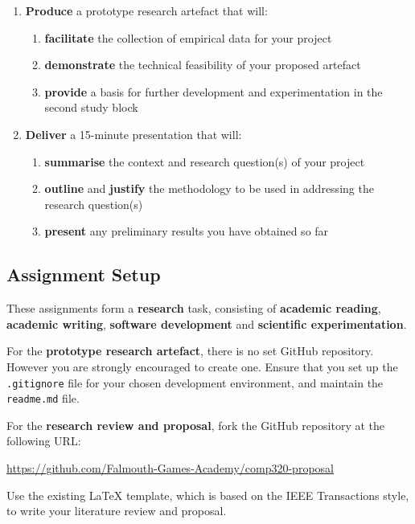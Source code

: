 \documentclass{../fal_assignment}
\begin{document}
\begin{enumerate}[label=(\Alph*)]
\begin{enumerate}[label=(\roman*)]
		\end{enumerate}
	\item \textbf{Produce} a prototype research artefact that will:
		\begin{enumerate}[label=(\roman*)]
			\item \textbf{facilitate} the collection of empirical data for your project
			\item \textbf{demonstrate} the technical feasibility of your proposed artefact
			\item \textbf{provide} a basis for further development and
				experimentation in the second study block
		\end{enumerate}
	\item \textbf{Deliver} a 15-minute presentation that will:
		\begin{enumerate}[label=(\roman*)]
			\item \textbf{summarise} the context and research question(s)
				of your project
			\item \textbf{outline} and \textbf{justify} the methodology to be used in
				addressing the research question(s)
			\item \textbf{present} any preliminary results you have obtained so far
		\end{enumerate}
\end{enumerate}

\subsection*{Assignment Setup}

These assignments form a \textbf{research} task, consisting of \textbf{academic reading}, \textbf{academic writing},
\textbf{software development} and \textbf{scientific experimentation}.

For the \textbf{prototype research artefact}, there is no set GitHub repository.
However you are strongly encouraged to create one.
Ensure that you set up the \texttt{.gitignore} file for your chosen development environment,
and maintain the \texttt{readme.md} file.

For the \textbf{research review and proposal}, fork the GitHub repository at the following URL:

\indent \url{https://github.com/Falmouth-Games-Academy/comp320-proposal}

Use the existing LaTeX template, which is based on the IEEE Transactions style,
to write your literature review and proposal.
\end{document}
